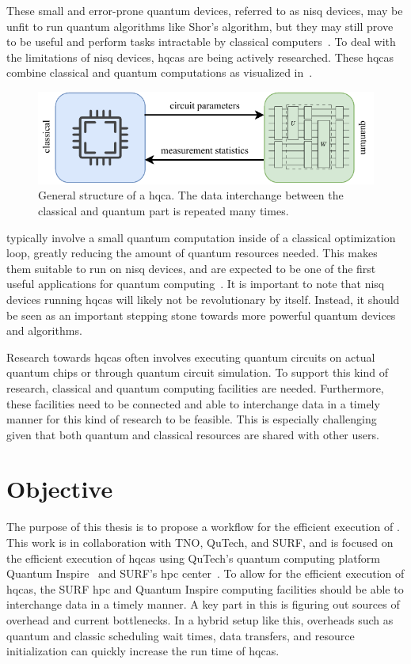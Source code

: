 These small and error-prone quantum devices, referred to as \gls{nisq} devices, may be unfit to run quantum algorithms like Shor's algorithm, but they may still prove to be useful and perform tasks intractable by classical computers~\cite{preskill2018quantum}.
To deal with the limitations of \gls{nisq} devices, \glspl{hqca} are being actively researched.
These \glspl{hqca} combine classical and quantum computations as visualized in~.
\begin{figure}[ht]
    \centering
    \includegraphics[width=0.7\linewidth]{figures/hybrid-quantum-algorithm.pdf}
    \caption[General structure of a \acrshort{hqca}.]{
        General structure of a \gls{hqca}.
        The data interchange between the classical and quantum part is repeated many times.
    }
    \label{fig:hybrid-quantum-classical}
\end{figure}
 typically involve a small quantum computation inside of a classical optimization loop, greatly reducing the amount of quantum resources needed.
This makes them suitable to run on \gls{nisq} devices, and are expected to be one of the first useful applications for quantum computing~\cite{endo2021hybrid}.
It is important to note that \gls{nisq} devices running \glspl{hqca} will likely not be revolutionary by itself.
Instead, it should be seen as an important stepping stone towards more powerful quantum devices and algorithms.

Research towards \glspl{hqca} often involves executing quantum circuits on actual quantum chips or through quantum circuit simulation.
To support this kind of research, classical and quantum computing facilities are needed.
Furthermore, these facilities need to be connected and able to interchange data in a timely manner for this kind of research to be feasible.
This is especially challenging given that both quantum and classical resources are shared with other users.

\section{Objective}
The purpose of this thesis is to propose a workflow for the efficient execution of .
This work is in collaboration with TNO, QuTech, and SURF, and is focused on the efficient execution of \glspl{hqca} using QuTech's quantum computing platform Quantum Inspire~\cite{quantuminspire} and SURF's \gls{hpc} center~\cite{surf}.
To allow for the efficient execution of \glspl{hqca}, the SURF \gls{hpc} and Quantum Inspire computing facilities should be able to interchange data in a timely manner.
A key part in this is figuring out sources of overhead and current bottlenecks.
In a hybrid setup like this, overheads such as quantum and classic scheduling wait times, data transfers, and resource initialization can quickly increase the run time of \glspl{hqca}.

